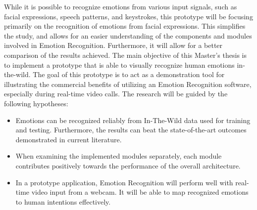 While it is possible to recognize emotions from various input signals, such as facial expressions, speech patterns, and keystrokes, this prototype will be focusing primarily on the recognition of emotions from facial expressions. This simplifies the study, and allows for an easier understanding of the components and modules involved in Emotion Recognition. Furthermore, it will allow for a better comparison of the results achieved. 
\newline\newline
The main objective of this Master's thesis is to implement a prototype that is able to visually recognize human emotions in-the-wild. The goal of this prototype is to act as a demonstration tool for illustrating the commercial benefits of utilizing an Emotion Recognition software, especially during real-time video calls. 
\newline\newline
The research will be guided by the following hypotheses: 
\begin{itemize}
    \item Emotions can be recognized reliably from In-The-Wild data used for training and testing. Furthermore, the results can beat the state-of-the-art outcomes demonstrated in current literature.
    \item When examining the implemented modules separately, each module contributes positively towards the performance of the overall architecture.
    \item In a prototype application, Emotion Recognition will perform well with real-time video input from a webcam. It will be able to map recognized emotions to human intentions effectively.

\end{itemize}

